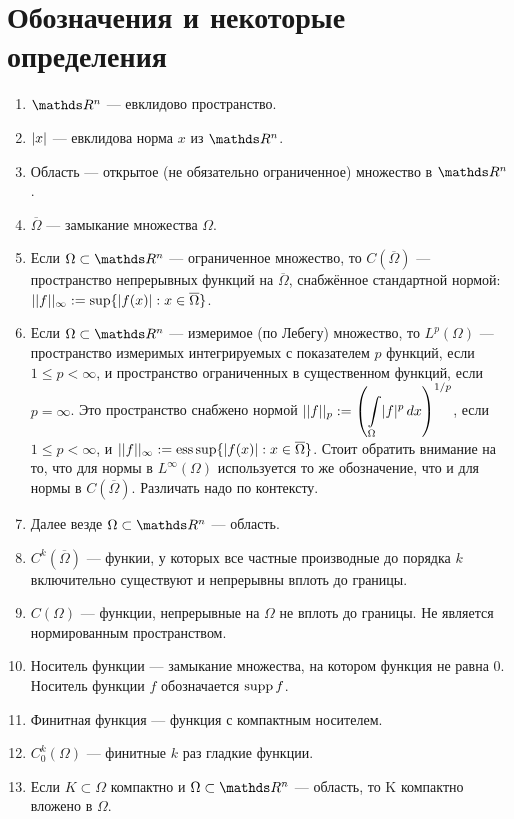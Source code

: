 \section*{Обозначения и некоторые определения}
\begin{enumerate}
\item $\real^n$ --- евклидово пространство.
\item $\lvert x\rvert$ --- евклидова норма $x$ из $\real^n$.
\item Область --- открытое (не обязательно ограниченное) множество в $\real^n$.
\item $\overline{\Omega}$ --- замыкание множества $\Omega$.
\item Если $\Omega \subset \real^n$ --- ограниченное множество, то $C(\overline{\Omega})$ --- пространство непрерывных функций на $\overline{\Omega}$, снабжённое стандартной нормой: $||f||_{\infty} := \sup \{ \lvert f(x)\rvert : x \in \overline{\Omega} \}$.
\item Если $\Omega \subset \real^n$ --- измеримое (по Лебегу) множество, то $L^p (\Omega)$ --- пространство измеримых интегрируемых с показателем $p$ функций, если $1 \leq p < \infty$, и пространство ограниченных в существенном функций, если $p = \infty$. Это пространство снабжено нормой $||f||_p := \left( \displaystyle \int \limits_{\Omega} \lvert f\rvert^p \,dx \right)^{1/p}$, если $1 \leq p < \infty$, и $||f||_{\infty} := \operatorname{ess\,sup} \{ \lvert f(x)\rvert : x \in \overline{\Omega} \}$. Стоит обратить внимание на то, что для нормы в $L^{\infty}(\Omega)$ используется то же обозначение, что и для нормы в $C(\overline{\Omega})$. Различать надо по контексту.
\item Далее везде $\Omega \subset \real^n$ --- область. 
\item $C^k(\overline{\Omega})$ --- функии, у которых все частные производные до порядка $k$ включительно существуют и непрерывны вплоть до границы.
\item $C(\Omega)$ --- функции, непрерывные на $\Omega$ не вплоть до границы. Не является нормированным пространством.
\item Носитель функции --- замыкание множества, на котором функция не равна $0$. Носитель функции $f$ обозначается $\operatorname{supp} f$.
\item Финитная функция --- функция с компактным носителем.
\item $C^k_0(\Omega)$ --- финитные $k$ раз гладкие  функции.
\item Если $K \subset \Omega$ компактно и $\Omega \subset \real^n$ --- область, то K компактно вложено в $\Omega$.

\end{enumerate}
